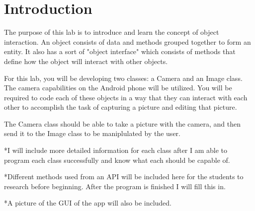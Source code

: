 \section{Introduction}

The purpose of this lab is to introduce and learn the concept of object interaction. An object consists of data and methods grouped together to form an entity. It also has a sort of "object interface" which consists of methods that define how the object will interact with other objects.

\noindent
For this lab, you will be developing two classes: a Camera and an Image class. The camera capabilities on the Android phone will be utilized. You will be required to code each of these objects in a way that they can interact with each other to accomplish the task of capturing a picture and editing that picture.

\noindent
The Camera class should be able to take a picture with the camera, and then send it to the Image class to be maniplulated by the user.

\noindent
*I will include more detailed information for each class after I am able to program each class successfully and know what each should be capable of.

\noindent
*Different methods used from an API will be included here for the students to research before beginning. After the program is finished I will fill this in. 

\noindent
*A picture of the GUI of the app will also be included.